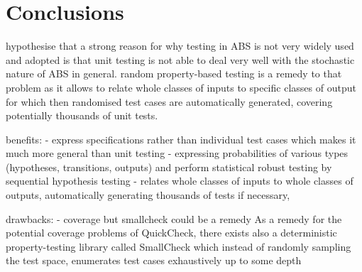 \section{Conclusions}
hypothesise that a strong reason for why testing in ABS is not very widely used and adopted is that unit testing is not able to deal very well with the stochastic nature of ABS in general. random property-based testing is a remedy to that problem as it allows to relate whole classes of inputs to specific classes of output for which then randomised test cases are automatically generated, covering potentially thousands of unit tests.

benefits:
- express specifications rather than individual test cases which makes it much more general than unit testing
- expressing probabilities of various types (hypotheses, transitions, outputs) and perform statistical robust testing by sequential hypothesis testing
- relates whole classes of inputs to whole classes of outputs, automatically generating thousands of tests if necessary, 

drawbacks:
- coverage but smallcheck could be a remedy
As a remedy for the potential coverage problems of QuickCheck, there exists also a deterministic property-testing library called SmallCheck \cite{runciman_smallcheck_2008} which instead of randomly sampling the test space, enumerates test cases exhaustively up to some depth